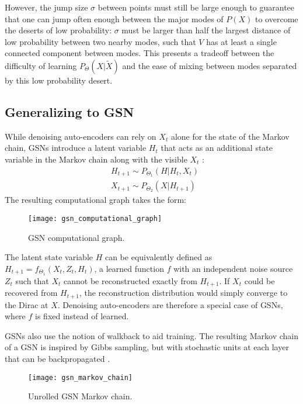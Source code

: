 However, the jump size \(\sigma\) between points must still be large enough to guarantee that one can jump often enough between the major modes of \(P(X)\) to overcome the deserts of low probability: \(\sigma\) must be larger than half the largest distance of low probability between two nearby modes, such that \(V\) has at least a single connected component between modes. This presents a tradeoff between the difficulty of learning \(P_{\Theta}(X|\widetilde{X})\) and the ease of mixing between modes separated by this low probability desert.


\subsection{Generalizing to GSN}

While denoising auto-encoders can rely on \(X_t\) alone for the state of the Markov chain, GSNs introduce a latent variable \(H_t\) that acts as an additional state variable in the Markov chain along with the visible \(X_t\) \cite{gsn}:
\begin{align*}
 &H_{t+1} \sim P_{\Theta_1}(H|H_t, X_t)\\
 &X_{t+1} \sim  P_{\Theta_2}(X|H_{t+1})
\end{align*}
The resulting computational graph takes the form:

\begin{figure}[h!]
  \centering
    \texttt{[image: gsn\_computational\_graph]}
\caption{GSN computational graph.}
\end{figure}
The latent state variable \(H\) can be equivalently defined as \(H_{t+1} = f_{\Theta_1}(X_t,Z_t,H_t)\), a learned function \(f\) with an independent noise source \(Z_t\) such that \(X_t\) cannot be reconstructed exactly from \(H_{t+1}\). If \(X_t\) could be recovered from \(H_{t+1}\), the reconstruction distribution would simply converge to the Dirac at \(X\). Denoising auto-encoders are therefore a special case of GSNs, where \(f\) is fixed instead of learned.

GSNs also use the notion of walkback to aid training. The resulting Markov chain of a GSN is inspired by Gibbs sampling, but with stochastic units at each layer that can be backpropagated \cite{rezende14}.

\begin{figure}[h!]
  \centering
    \texttt{[image: gsn\_markov\_chain]}
\caption{Unrolled GSN Markov chain.}
\end{figure}



